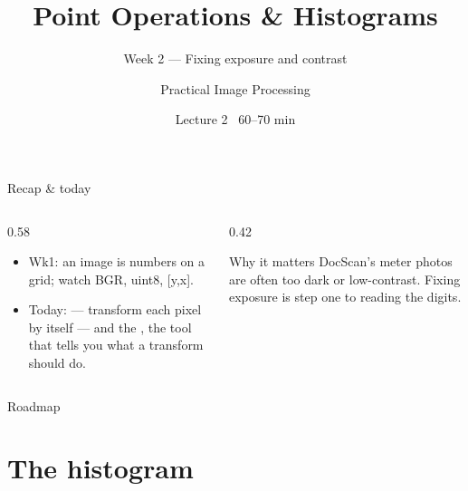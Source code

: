 \documentclass[10pt,aspectratio=169]{beamer}
\title{Point Operations \& Histograms}
\subtitle{Week 2 — Fixing exposure and contrast}
\author{Practical Image Processing}
\date{Lecture 2 \textbullet\ 60--70 min}
\begin{document}
\maketitle

\begin{frame}{Recap \& today}
  \begin{columns}[T]
    \begin{column}{0.58\textwidth}
      \begin{itemize}
        \item Wk1: an image is numbers on a grid; watch BGR, uint8, [y,x].
        \item \alert{Today:}  — transform each pixel by itself — and the
              , the tool that tells you what a transform should do.
      \end{itemize}
    \end{column}
    \begin{column}{0.42\textwidth}
      \begin{alertblock}{Why it matters}
        DocScan's meter photos are often too dark or low-contrast. Fixing exposure is step one
        to reading the digits.
      \end{alertblock}
    \end{column}
  \end{columns}
\end{frame}

\begin{frame}{Roadmap}\tableofcontents\end{frame}

\section{The histogram}
\end{document}
